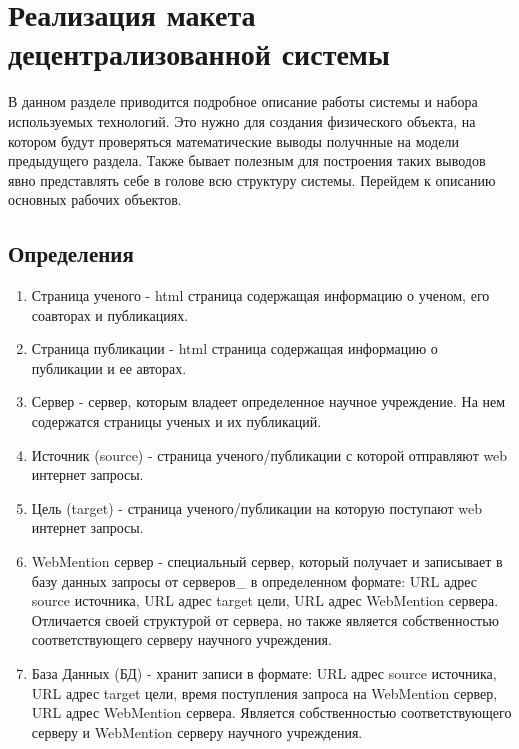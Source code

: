 \hypertarget{ux440ux435ux430ux43bux438ux437ux430ux446ux438ux44f-ux43cux430ux43aux435ux442ux430-ux434ux435ux446ux435ux43dux442ux440ux430ux43bux438ux437ux43eux432ux430ux43dux43dux43eux439-ux441ux438ux441ux442ux435ux43cux44b}{%
\section{Реализация макета децентрализованной
системы}\label{ux440ux435ux430ux43bux438ux437ux430ux446ux438ux44f-ux43cux430ux43aux435ux442ux430-ux434ux435ux446ux435ux43dux442ux440ux430ux43bux438ux437ux43eux432ux430ux43dux43dux43eux439-ux441ux438ux441ux442ux435ux43cux44b}}

В данном разделе приводится подробное описание работы системы и набора
используемых технологий. Это нужно для создания физического объекта, на
котором будут проверяться математические выводы получнные на модели
предыдущего раздела. Также бывает полезным для построения таких выводов
явно представлять себе в голове всю структуру системы. Перейдем к
описанию основных рабочих объектов.

\hypertarget{ux43eux43fux440ux435ux434ux435ux43bux435ux43dux438ux44f-1}{%
\subsection{Определения}\label{ux43eux43fux440ux435ux434ux435ux43bux435ux43dux438ux44f-1}}

\begin{enumerate}
\def\labelenumi{\arabic{enumi}.}
\tightlist
\item
  Страница ученого - html страница содержащая информацию о ученом, его
  соавторах и публикациях.
\item
  Страница публикации - html страница содержащая информацию о публикации
  и ее авторах.
\item
  Сервер - сервер, которым владеет определенное научное учреждение. На
  нем содержатся страницы ученых и их публикаций.
\item
  Источник (source) - страница ученого/публикации с которой отправляют
  web интернет запросы.
\item
  Цель (target) - страница ученого/публикации на которую поступают web
  интернет запросы.
\item
  WebMention сервер - специальный сервер, который получает и записывает
  в базу данных запросы от серверов\_ в определенном формате: URL адрес
  source источника, URL адрес target цели, URL адрес WebMention сервера.
  Отличается своей структурой от сервера, но также является
  собственностью соответствующего серверу научного учреждения.
\item
  База Данных (БД) - хранит записи в формате: URL адрес source
  источника, URL адрес target цели, время поступления запроса на
  WebMention сервер, URL адрес WebMention сервера. Является
  собственностью соответствующего серверу и WebMention серверу научного
  учреждения.
\end{enumerate}

